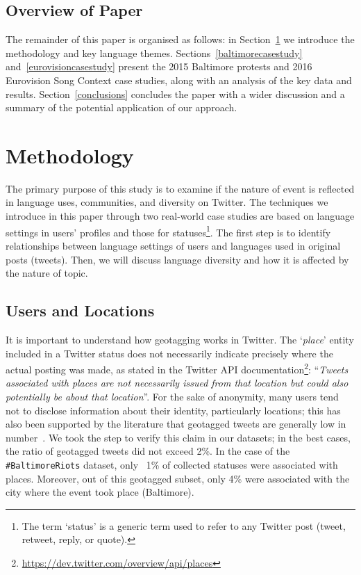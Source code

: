 \subsection{Overview of Paper}

The remainder of this paper is organised as follows: in
Section~\ref{method} we introduce the methodology and key
language themes.  Sections~\ref{baltimorecasestudy}
and~\ref{eurovisioncasestudy} present the 2015 Baltimore protests and
2016 Eurovision Song Context case studies, along with an analysis of
the key data and results. Section~\ref{conclusions} concludes the
paper with a wider discussion and a summary of the potential
application of our approach.

\section{Methodology}\label{method}

The primary purpose of this study is to examine if the nature of event
is reflected in language uses, communities, and diversity on
Twitter. The techniques we introduce in this paper through two
real-world case studies are based on language settings in users'
profiles and those for statuses\footnote{The term `status' is a
generic term used to refer to any Twitter post (tweet, retweet, reply,
or quote).}.  The first step is to identify relationships between
language settings of users and languages used in original posts
(tweets). Then, we will discuss language diversity and how it is
affected by the nature of topic.

\subsection{Users and Locations}

It is important to understand how geotagging works in Twitter. The
`{\emph{place}}' entity included in a Twitter status does not
necessarily indicate precisely where the actual posting was made, as
stated in the Twitter API
documentation\footnote{\url{https://dev.twitter.com/overview/api/places}}:
``{\emph{Tweets associated with places are not necessarily issued from
that location but could also potentially be about that
location}}''. For the sake of anonymity, many users tend not to
disclose information about their identity, particularly locations;
this has also been supported by the literature that geotagged tweets
are generally low in number~\cite{kang-et-al:2013}. We took the step
to verify this claim in our datasets; in the best cases, the ratio of
geotagged tweets did not exceed 2\%. In the case of the
{\texttt{\#BaltimoreRiots}} dataset, only ~1\% of collected statuses
were associated with places. Moreover, out of this geotagged subset,
only 4\% were associated with the city where the event took place
(Baltimore).

